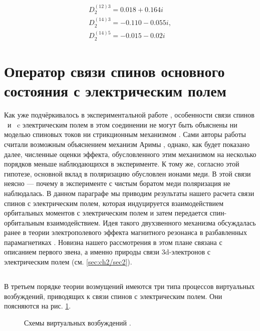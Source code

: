 \begin{equation}
	\label{eq:Dparams}
	\begin{array}{l}
		D_{2}^{(12) 3}=0.018+0.164 i \\
		D_{2}^{(14) 3}=-0.110-0.055 i, \\
		D_{2}^{(14) 5}=-0.015-0.02 i
	\end{array}
\end{equation}

\section{Оператор связи спинов основного состояния с электрическим полем}\label{sec:ch2/sec3}

Как уже подчёркивалось в экспериментальной работе \cite{Khanh2013}, особенности связи спинов \cu\ и \niIon\ c электрическим полем в этом соединении не могут быть объяснены ни моделью спиновых токов \cite{Katsura2005} ни стрикционным механизмом \cite{Sergienko2006}. Сами авторы работы \cite{Khanh2013} считали возможным объяснением механизм Аримы \cite{Arima2007}, однако, как будет показано далее, численные оценки эффекта, обусловленного этим механизмом на несколько порядков меньше наблюдающихся в эксперименте. К тому же, согласно этой гипотезе, основной вклад в поляризацию обусловлен ионами меди. В этой связи неясно --- почему в эксперименте с чистым боратом меди \cite{Nenert2007} поляризация не наблюдалась. 
В данном параграфе мы приводим результаты нашего расчета связи спинов с электрическим полем, которая индуцируется взаимодействием орбитальных моментов с электрическим полем и затем передается спин-орбитальным взаимодействием. Идея такого двухзвенного механизма обсуждалась ранее в теории электрополевого эффекта магнитного резонанса в разбавленных парамагнетиках \cite{Mims}. Новизна нашего рассмотрения в этом плане связана с описанием первого звена, а именно природы связи 3d-электронов с электрическим полем (см. \cref{sec:ch2/sec2}). 

\subsection{\nif}\label{subsec:ch2/sec3/sub1}

В третьем порядке теории возмущений имеются три типа процессов виртуальных возбуждений, приводящих к связи спинов с электрическим полем. Они поясняются на рис. \cref{fig:ni_trans}.

\begin{figure}[ht]
	\caption{Схемы виртуальных возбуждений \nif.}
	\label{fig:ni_trans}
\end{figure}

